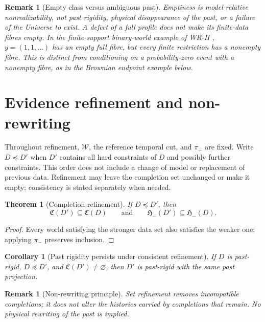 \documentclass[11pt]{article}
\newtheorem{theorem}[definition]{Theorem}
\newtheorem{corollary}[definition]{Corollary}
\newtheorem{remark}[definition]{Remark}
\newcommand{\Wcal}{\mathcal W}
\newcommand{\Ccal}{\mathfrak C}
\newcommand{\Pcal}{\mathfrak H_-}
\begin{document}
\begin{remark}[Empty class versus ambiguous past]
\label{rem:empty-past}
Emptiness is model-relative nonrealizability, not past rigidity,
physical disappearance of the past, or a failure of the Universe to
exist. A defect of a full profile does not make its finite-data fibres
empty. In the finite-support binary-world example of WR-II
\cite[Section 7]{WRII}, $y=(1,1,\ldots)$ has an empty full fibre,
but every finite restriction has a nonempty fibre. This is distinct
from conditioning on a probability-zero event with a nonempty fibre,
as in the Brownian endpoint example below.
\end{remark}

\section{Evidence refinement and non-rewriting}
Throughout refinement, $\Wcal$, the reference temporal cut, and $\pi_-$
are fixed. Write $D\preceq D'$ when $D'$ contains all hard constraints
of $D$ and possibly further constraints. This order does not include a
change of model or replacement of previous data. Refinement may leave
the completion set unchanged or make it empty; consistency is stated
separately when needed.
\begin{theorem}[Completion refinement]
\label{thm:completion-refinement}
If $D\preceq D'$, then
\[
\Ccal(D')\subseteq\Ccal(D)
\qquad\text{and}\qquad
\Pcal(D')\subseteq\Pcal(D).
\]
\end{theorem}
\begin{proof}
Every world satisfying the stronger data set also satisfies the weaker one; applying $\pi_-$ preserves inclusion.
\end{proof}
\begin{corollary}[Past rigidity persists under consistent refinement]
\label{cor:rigidity-persistence}
If $D$ is past-rigid, $D\preceq D'$, and $\Ccal(D')\neq\varnothing$, then $D'$ is past-rigid with the same past projection.
\end{corollary}
\begin{remark}[Non-rewriting principle]
Set refinement removes incompatible completions; it does not alter the histories carried by completions that remain. No physical rewriting of the past is implied.
\end{remark}
\end{document}
